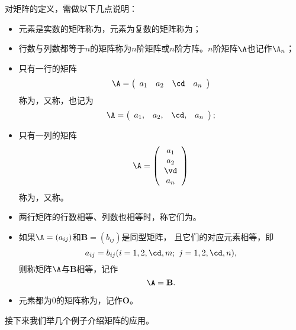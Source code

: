 \begin{zhu*}
  对矩阵的定义，需做以下几点说明：
  \begin{itemize}
  \item 
    元素是实数的矩阵称为，元素为复数的矩阵称为；
  \item
    行数与列数都等于$n$的矩阵称为$n$阶矩阵或$n$阶方阵。$n$阶矩阵$\A$也记作$\A_n$；
  \item
    只有一行的矩阵
    $$
    \A = \left(
      \begin{array}{cccc}
        a_1 & a_2 & \cd & a_n
      \end{array}
    \right )
    $$
    称为，又称，也记为
    $$
    \A = \left(
      \begin{array}{cccc}
        a_1, & a_2, & \cd, & a_n
      \end{array}
    \right );
    $$
  \item
    只有一列的矩阵
    $$
    \A = \left(
      \begin{array}{c}
        a_1 \\
        a_2 \\
        \vd \\
        a_n
      \end{array}
    \right )
    $$
    称为，又称。
  \item 
    两行矩阵的行数相等、列数也相等时，称它们为。
  \item
    如果$\A=(a_{ij})$和$\mathbf{B}=(b_{ij})$是同型矩阵，
    且它们的对应元素相等，即
    $$
    a_{ij} = b_{ij}(i=1,2,\cd,m; \ j =1,2,\cd,n),
    $$
    则称矩阵$\A$与$\mathbf{B}$相等，记作
    $$
    \A = \mathbf{B}.
    $$
  \item
    元素都为0的矩阵称为，记作{$\mathbf{O}$}。
  \end{itemize}
\end{zhu*}
\vspace{.1in} \noindent
接下来我们举几个例子介绍矩阵的应用。
